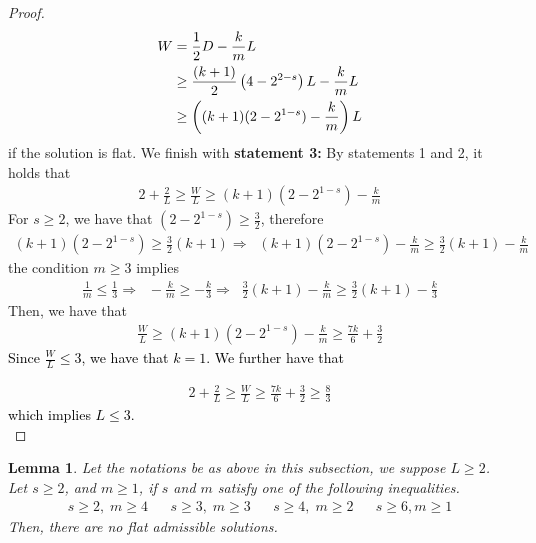 \documentclass[12pt,twoside,]{amsart}
\theoremstyle{plain}
\newtheorem{lemma}[theorem]{Lemma}
\theoremstyle{definition}
\begin{document}
\begin{proof}
\begin{align}
 W &=  \frac{1}{2}D - \frac{k}{m}L   
 \notag
 \\ 
 & \geq
\frac{(k+1)}{2}\left( 4 -2^{2-s}\right)L - \frac{k}{m}L
\label{eq:lower_bound_W flat}
\\ & 
\geq 
\left( (k+1)(2 -2^{1-s})- \frac{k}{m}\right)L  
\notag
\end{align}
if the solution is flat.
We finish with \textbf{statement 3:} 
By statements 1 and 2, it holds that
\begin{align*}
2 + \frac{2}{L} \geq \frac{W}{L}  \geq 
 (k+1)(2 -2^{1-s})- \frac{k}{m}
\end{align*}
For $s \geq 2$, we have that $(2 -2^{1-s}) \geq \frac{3}{2}$, therefore
\begin{align*}
(k+1)(2 -2^{1-s}) \geq \frac{3}{2}(k+1)   
   \Longrightarrow\;\;
(k+1)(2 -2^{1-s}) 
- \frac{k}{m}
\geq \frac{3}{2} (k+1)- \frac{k}{m}     
\end{align*}
the condition $m \geq 3$ implies
\begin{align*}
    \frac{1}{m} \leq \frac{1}{3}
   \Longrightarrow\;\;
    - \frac{k}{m} \geq 
    - \frac{k}{3}
       \Longrightarrow\;\;
       \frac{3}{2}(k+1) - \frac{k}{m} 
       \geq 
       \frac{3}{2}(k+1) - \frac{k}{3}
\end{align*}
Then, we have that 
\begin{align*}
\frac{W}{L} \geq
 (k+1)(2 -2^{1-s}) 
- \frac{k}{m}
\geq 
\frac{7k}{6} + \frac{3}{2}
\end{align*}
\textcolor{black}{Since $\frac{W}{L} \leq 3$, we have that $k = 1$. We further have that}

\begin{align*}
2 + \frac{2}{L} \geq  \frac{W}{L}  \geq \frac{7k}{6}+ \frac{3}{2} \geq \frac{8}{3}
\end{align*}
\textcolor{black}{which implies $L \leq 3$.} \\

\end{proof}



\begin{lemma}
\label{lemma:forbidden_flat_admissible}
Let the notations be as above in this subsection, we suppose $L \geq 2$. 
Let $s \geq 2$, and $m \geq 1$, if $s$ and $m$ satisfy one of the following inequalities. 
\begin{align*}
s \geq 2, \; m\geq 4
&& 
s \geq 3, \; m \geq 3
&&
s\geq 4, \;  m\geq 2
&& 
s \geq 6, m \geq 1
\end{align*}
Then, there are no flat admissible solutions. \\
\end{lemma}
\end{document}
